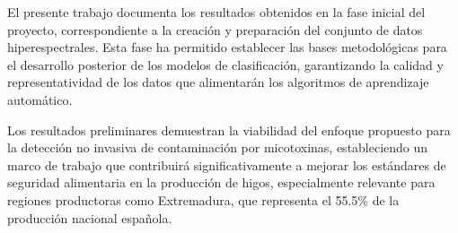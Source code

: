 \vspace{5mm}

El presente trabajo documenta los resultados obtenidos en la fase inicial del proyecto, correspondiente a la creación y preparación del conjunto de datos hiperespectrales. Esta fase ha permitido establecer las bases metodológicas para el desarrollo posterior de los modelos de clasificación, garantizando la calidad y representatividad de los datos que alimentarán los algoritmos de aprendizaje automático.

\vspace{5mm}

Los resultados preliminares demuestran la viabilidad del enfoque propuesto para la detección no invasiva de contaminación por micotoxinas, estableciendo un marco de trabajo que contribuirá significativamente a mejorar los estándares de seguridad alimentaria en la producción de higos, especialmente relevante para regiones productoras como Extremadura, que representa el 55.5\% de la producción nacional española.

